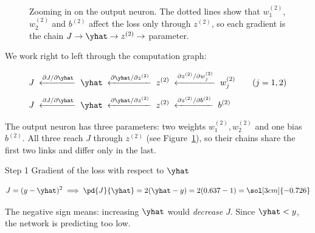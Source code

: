 \documentclass[12pt, a4paper]{article}
\begin{document}
\begin{figure}[H]
  \caption{Zooming in on the output neuron.  The dotted lines show that
    $w^{(2)}_1$, $w^{(2)}_2$ and $b^{(2)}$ affect the loss only through
    $z^{(2)}$, so each gradient is the chain
    $J \to \yhat \to z^{(2)} \to$ parameter.}
  \label{fig:output-chain}
\end{figure}


We work right to left through the computation graph:

\begin{align*}
  J \;\xleftarrow{\partial J/\partial \yhat}\;
  \yhat \;\xleftarrow{\partial \yhat/\partial z^{(2)}}\;
  z^{(2)} & \;\xleftarrow{\partial z^{(2)}/\partial w^{(2)}_j}\;
  w^{(2)}_j \qquad (j = 1, 2)                                    \\[0.4em]
  J \;\xleftarrow{\partial J/\partial \yhat}\;
  \yhat \;\xleftarrow{\partial \yhat/\partial z^{(2)}}\;
  z^{(2)} & \;\xleftarrow{\partial z^{(2)}/\partial b^{(2)}}\;
  b^{(2)}
\end{align*}

The output neuron has three parameters: two weights $w^{(2)}_1, w^{(2)}_2$
and one bias $b^{(2)}$.  All three reach $J$ through $z^{(2)}$
(see Figure~\ref{fig:output-chain}), so their chains share the first two
links and differ only in the last.

\begin{stepbox}{Step 1 \quad Gradient of the loss with respect to $\yhat$}

  \[
    J = (y - \yhat)^2
    \implies
    \pd{J}{\yhat}
    = 2(\yhat - y)
    = 2(0.637 - 1)
    = \sol[3cm]{-0.726}
  \]

  The negative sign means: increasing $\yhat$ would \emph{decrease} $J$.
  Since $\yhat < y$, the network is predicting too low.
\end{stepbox}
\end{document}
